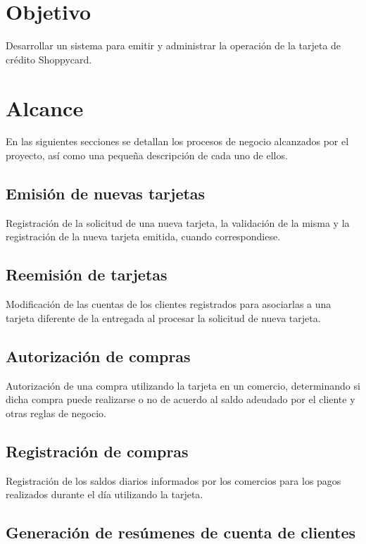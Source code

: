 \section{Objetivo}

Desarrollar un sistema para emitir y administrar la operación de la tarjeta de
crédito Shoppycard.


\section{Alcance}

En las siguientes secciones se detallan los procesos de negocio alcanzados por
el proyecto, así como una pequeña descripción de cada uno de ellos.

\subsection{Emisión de nuevas tarjetas}

Registración de la solicitud de una nueva tarjeta, la validación de la misma y
la registración de la nueva tarjeta emitida, cuando correspondiese.

\subsection{Reemisión de tarjetas}

Modificación de las cuentas de los clientes registrados para asociarlas a una
tarjeta diferente de la entregada al procesar la solicitud de nueva tarjeta.

\subsection{Autorización de compras}

Autorización de una compra utilizando la tarjeta en un comercio, determinando si
dicha compra puede realizarse o no de acuerdo al saldo adeudado por el cliente y
otras reglas de negocio.

\subsection{Registración de compras}

Registración de los saldos diarios informados por los comercios para los pagos
realizados durante el día utilizando la tarjeta.

\subsection{Generación de resúmenes de cuenta de clientes}

